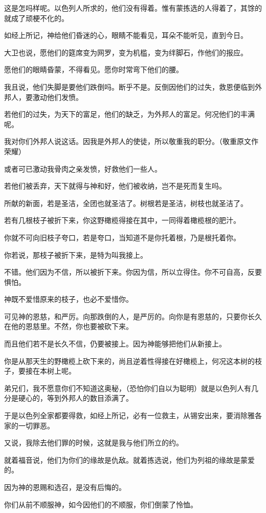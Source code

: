 \documentclass[12pt,oneside]{book}
\begin{document}
这是怎吗样呢。以色列人所求的，他们没有得着。惟有蒙拣选的人得着了，其馀的就成了顽梗不化的。

如经上所记，神给他们昏迷的心，眼睛不能看见，耳朵不能听见，直到今日。

大卫也说，愿他们的筵席变为网罗，变为机槛，变为绊脚石，作他们的报应。

愿他们的眼睛昏蒙，不得看见。愿你时常弯下他们的腰。

我且说，他们失脚是要他们跌倒吗。断乎不是。反倒因他们的过失，救恩便临到外邦人，要激动他们发愤。

若他们的过失，为天下的富足，他们的缺乏，为外邦人的富足。何况他们的丰满呢。

我对你们外邦人说这话。因我是外邦人的使徒，所以敬重我的职分。（敬重原文作荣耀）

或者可已激动我骨肉之亲发愤，好救他们一些人。

若他们被丢弃，天下就得与神和好，他们被收纳，岂不是死而复生吗。

所献的新面，若是圣洁，全团也就圣洁了。树根若是圣洁，树枝也就圣洁了。

若有几根枝子被折下来，你这野橄榄得接在其中，一同得着橄榄根的肥汁。

你就不可向旧枝子夸口，若是夸口，当知道不是你托着根，乃是根托着你。

你若说，那枝子被折下来，是特为叫我接上。

不错。他们因为不信，所以被折下来。你因为信，所以立得住。你不可自高，反要惧怕。

神既不爱惜原来的枝子，也必不爱惜你。

可见神的恩慈，和严厉。向那跌倒的人，是严厉的。向你是有恩慈的，只要你长久在他的恩慈里。不然，你也要被砍下来。

而且他们若不是长久不信，仍要被接上。因为神能够把他们从新接上。

你是从那天生的野橄榄上砍下来的，尚且逆着性得接在好橄榄上，何况这本树的枝子，要接在本树上呢。

弟兄们，我不愿意你们不知道这奥秘，（恐怕你们自以为聪明）就是以色列人有几分是硬心的，等到外邦人的数目添满了。

于是以色列全家都要得救，如经上所记，必有一位救主，从锡安出来，要消除雅各家的一切罪恶。

又说，我除去他们罪的时候，这就是我与他们所立的约。

就着福音说，他们为你们的缘故是仇敌。就着拣选说，他们为列祖的缘故是蒙爱的。

因为神的恩赐和选召，是没有后悔的。

你们从前不顺服神，如今因他们的不顺服，你们倒蒙了怜恤。
\end{document}
